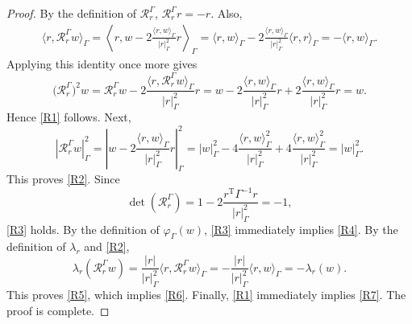 \documentclass[aap]{imsart}
\theoremstyle{plain}
\theoremstyle{definition}
\begin{document}
\begin{proof}
	By the definition of \(\mathcal R_r^\Gamma\), \(\mathcal R_r^\Gamma r = -r\).
	Also,
	\[
	\begin{aligned}
		\langle r,\mathcal R_r^\Gamma w\rangle_\Gamma
		=
		\left\langle
		r,
		w-2\frac{\langle r,w\rangle_\Gamma}{|r|_\Gamma^2}r
		\right\rangle_\Gamma     =
		\langle r,w\rangle_\Gamma
		-
		2\frac{\langle r,w\rangle_\Gamma}{|r|_\Gamma^2}
		\langle r,r\rangle_\Gamma  =
		-\langle r,w\rangle_\Gamma .
	\end{aligned}
	\]
Applying this identity once more gives
	\[\bigl(\mathcal R_r^\Gamma\bigr)^2w=
\mathcal R_r^\Gamma w-2\frac{\langle r,\mathcal R_r^\Gamma w\rangle_\Gamma}{|r|_\Gamma^2}r =w-2\frac{\langle r,w\rangle_\Gamma}{|r|_\Gamma^2}r+
2\frac{\langle r,w\rangle_\Gamma}{|r|_\Gamma^2}r=w.\]
	Hence \eqref{R1} follows.	
	Next,
	\[|\mathcal R_r^\Gamma w|_\Gamma^2
=\left|w-2\frac{\langle r,w\rangle_\Gamma}{|r|_\Gamma^2}r\right|_\Gamma^2                    =|w|_\Gamma^2-4\frac{\langle r,w\rangle_\Gamma^2}{|r|_\Gamma^2}
+4\frac{\langle r,w\rangle_\Gamma^2}{|r|_\Gamma^2}=|w|_\Gamma^2 .\]
This proves \eqref{R2}. Since
\[\det(\mathcal R_r^\Gamma)
=1-2\frac{r^{\mathrm T}\Gamma^{-1}r}{|r|_\Gamma^2}=-1,\]
\eqref{R3} holds. By the definition of \(\varphi_\Gamma(w)\),
\eqref{R3} immediately implies \eqref{R4}. By the definition of \(\lambda_r\) and \eqref{R2},
\[\lambda_r(\mathcal R_r^\Gamma w)
=\frac{|r|}{|r|_\Gamma^2}\langle r,\mathcal R_r^\Gamma w\rangle_\Gamma
=-\frac{|r|}{|r|_\Gamma^2}\langle r,w\rangle_\Gamma
=-\lambda_r(w).\]
This proves \eqref{R5}, which implies \eqref{R6}. Finally, \eqref{R1}
immediately implies \eqref{R7}. The proof is complete.
\end{proof}
\end{document}

